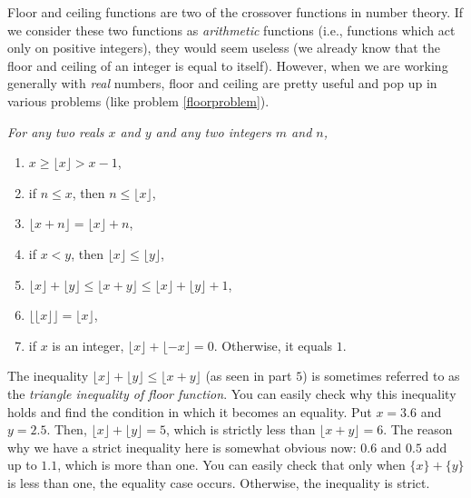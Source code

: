 \documentclass[12pt]{subfile}
\begin{document}
	    \begin{note}
	        Floor and ceiling functions are two of the crossover functions in number theory. If we consider these two functions as \textit{arithmetic} functions (i.e., functions which act only on positive integers), they would seem useless (we already know that the floor and ceiling of an integer is equal to itself). However, when we are working generally with \textit{real} numbers, floor and ceiling are pretty useful and pop up in various problems (like problem \eqref{floorproblem}).
	    \end{note}
	    
        \begin{proposition}\slshape \label{prop:floor}
        	For any two reals $x$ and $y$ and any two integers $m$ and $n$,
        	\begin{enumerate}[1.]
        		\item $x\geq\lfloor x\rfloor>x-1$,
        		\item if $n \leq x$, then $n \leq \lfloor x \rfloor$,
        		\item $\lfloor x+n\rfloor=\lfloor x\rfloor+n$,
        		\item if $x <y$, then $\lfloor x \rfloor \leq \lfloor y \rfloor$,
        		\item $\lfloor x\rfloor+\lfloor y \rfloor\leq \lfloor x+y\rfloor \leq \lfloor x\rfloor+\lfloor y\rfloor+1$,
        		\item $\lfloor \lfloor x\rfloor\rfloor  =  \lfloor x\rfloor$,
        		\item if $x$ is an integer, $\lfloor x\rfloor+\lfloor -x\rfloor=0$. Otherwise, it equals $1$.
        	\end{enumerate}
        \end{proposition}
        
        \begin{example}
        	The inequality $\lfloor x\rfloor+\lfloor y\rfloor \leq \lfloor x+y\rfloor$ (as seen in part $5$) is sometimes referred to as the \textit{triangle inequality of floor function}. You can easily check why this inequality holds and find the condition in which it becomes an equality. Put $x=3.6$ and $y=2.5$. Then, $\lfloor x\rfloor+\lfloor y\rfloor = 5$, which is strictly less than $\lfloor x+y\rfloor=6$. The reason why we have a strict inequality here is somewhat obvious now: $0.6$ and $0.5$ add up to $1.1$, which is more than one. You can easily check that only when $\{x\} + \{y\}$ is less than one, the equality case occurs. Otherwise, the inequality is strict.
        \end{example}
        
\end{document}
